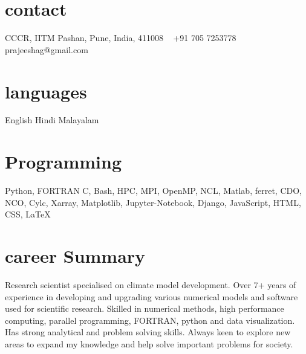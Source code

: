 \documentclass[]{cv-style}          %
\begin{document}
\lastupdated


\begin{aside}
%
\section{contact}
CCCR, IITM
Pashan, Pune,
India, 411008
~
+91 705 7253778
~
prajeeshag@gmail.com
%
\section{languages}
English
Hindi
Malayalam
%
\section{Programming}
    Python, FORTRAN
    C, Bash, HPC, MPI, OpenMP, NCL, Matlab, ferret, CDO, NCO, Cylc, Xarray, Matplotlib, Jupyter-Notebook, Django, JavaScript, HTML, CSS, \LaTeX{}
%
\end{aside}

\section{career Summary}
  \vspace{-0.2cm}
Research scientist specialised on climate model development. Over 7+ years of experience in developing and upgrading various numerical models and software used for scientific research. Skilled in numerical methods, high performance computing, parallel programming, FORTRAN, python and data visualization. Has strong analytical and problem solving skills. Always keen to explore new areas to expand my knowledge and help solve important problems for society.
\end{document}
